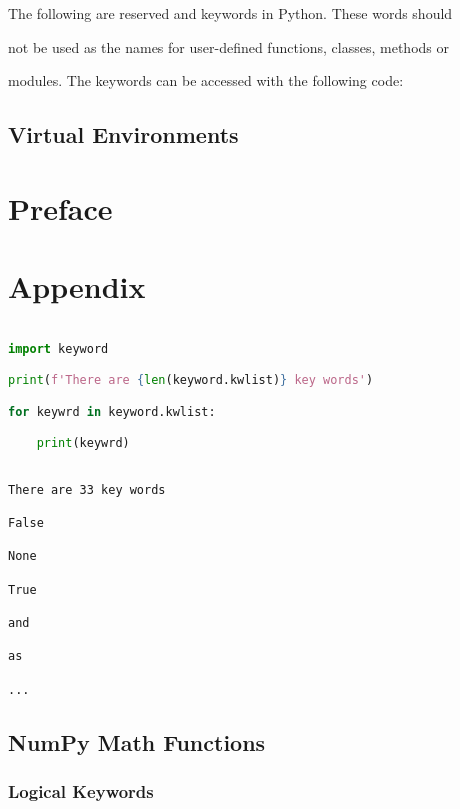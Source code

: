 

    

        The following are reserved and keywords in Python. These words should

not be used as the names for user-defined functions, classes, methods or

modules. The keywords can be accessed with the following code:

    





        \section{Virtual Environments}\label{virtual-environments}

    

\chapter*{Preface}\label{preface}
                    

                  

\chapter*{Appendix}\label{appendix} 


    

        \begin{lstlisting}[language=Python]

import keyword

print(f'There are {len(keyword.kwlist)} key words')

for keywrd in keyword.kwlist:

    print(keywrd)

\end{lstlisting}



\begin{lstlisting}

There are 33 key words

False

None

True

and

as

...

\end{lstlisting}

    

    \section{NumPy Math Functions}\label{numpy-math-functions}







    

        \subsection{Logical Keywords}\label{logical-keywords}

    





